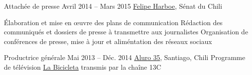 \begin{joblist}
{		%
	}



\item[Attachée de presse]{Avril 2014 -- Mars 2015}
     { \href{https://www.harboe.cl/}{Felipe Harboe}, Sénat du Chili } 
	 {
                
		\iftbftiny \vspace{-0.5cm} \fi
			\begin{itemize}
			  \iftbftiny \setlength\itemsep{-3pt} \fi
			  \cvitem[\checkmark] Élaboration et mise en œuvre des plans de communication
			  \cvitem[\checkmark] Rédaction des communiqués et dossiers de presse à transmettre aux journalistes
			  \cvitem[\checkmark] Organisation de conférences de presse, mise à jour et aliméntation des réseaux sociaux
			\end{itemize}     
			
	}
    
    
    
\item[Productrice générale]{Mai 2013 -- Déc. 2014}
     {\href{https://www.aluro35.com/}  {Aluro 35}, Santiago, Chili}
     {Programme de télévision \href{http://www.13.cl/c/programas/la-bicicleta}{La Bicicleta} transmis par la chaîne 13C \\
			
}
\end{joblist}

